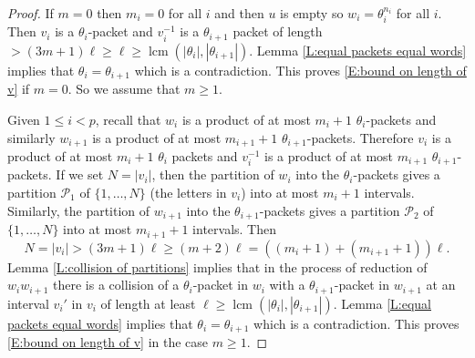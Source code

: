 \documentclass[12pt]{amsart}
\theoremstyle{definition}
\newcommand{\C}[1]{\mathcal{#1}}
\newcommand{\OP}[1]{\operatorname{#1}}
\begin{document}
\begin{proof}
If $m=0$ then $m_i=0$ for all $i$ and then $u$ is empty so $w_i=\theta_i^{n_i}$ for all $i$.
Then $v_i$ is a $\theta_i$-packet and $v_{i}^{-1}$ is a $\theta_{i+1}$ packet of length $>(3m+1)\ell \geq \ell \geq \OP{lcm}(|\theta_i|,|\theta_{i+1}|)$.
Lemma \ref{L:equal packets equal words}  implies that $\theta_i=\theta_{i+1}$ which is a contradiction.
This proves \eqref{E:bound on length of v} if $m=0$.
So we assume that $m\geq 1$.

Given $1 \leq i <p$, recall that $w_i$ is a product of at most $m_i+1$ $\theta_i$-packets and similarly $w_{i+1}$ is a product of at most $m_{i+1}+1$ $\theta_{i+1}$-packets.
Therefore $v_i$ is a product of at most $m_i+1$ $\theta_i$ packets and $v_i^{-1}$ is a product of at most $m_{i+1}$ $\theta_{i+1}$-packets.
If we set $N=|v_i|$, then the partition of $w_i$ into the $\theta_i$-packets gives a partition $\C P_1$ of $\{1,\dots,N\}$ (the letters in $v_i$) into at most $m_i+1$ intervals.
Similarly, the partition of $w_{i+1}$ into the $\theta_{i+1}$-packets gives a partition $\C P_2$ of $\{1,\dots,N\}$ %
into at most $m_{i+1}+1$ intervals.
Then
\[
N = 
|v_i| > 
(3m+1)\ell \geq %
(m+2)\ell =
((m_i+1)+(m_{i+1}+1))\ell.
\]
Lemma \ref{L:collision of partitions} implies that in the process of reduction of $w_iw_{i+1}$ there is a collision of a $\theta_i$-packet in $w_i$ with a $\theta_{i+1}$-packet in $w_{i+1}$ at an interval $v_i'$ in $v_i$ of length at least $\ell \geq \OP{lcm}(|\theta_i|,|\theta_{i+1}|)$.
Lemma \ref{L:equal packets equal words} implies that $\theta_i=\theta_{i+1}$ which is a contradiction. %
This proves \eqref{E:bound on length of v} in the case $m \geq 1$.


\end{proof}
\end{document}
